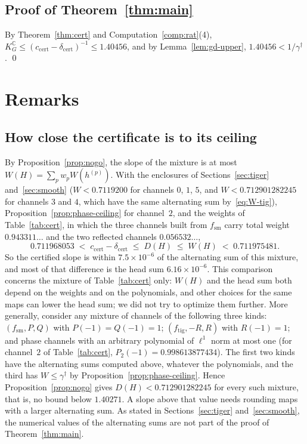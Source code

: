 \documentclass[11pt,reqno]{amsart}
\theoremstyle{definition}
\numberwithin{equation}{section}
\newcommand{\C}{\mathbb{C}}
\newcommand{\KGC}{K_G^{\C}}
\newcommand{\gd}{\gamma^\dagger}
\newcommand{\ftig}{f_{\mathrm{tig}}}
\newcommand{\fsm}{f_{\mathrm{sm}}}
\newcommand{\ccert}{c_{\mathrm{cert}}}
\newcommand{\dcert}{\delta_{\mathrm{cert}}}
\begin{document}
\subsection{Proof of Theorem~\ref{thm:main}}
By Theorem~\ref{thm:cert} and Computation~\ref{comp:rat}(4), $\KGC\le(\ccert-\dcert)^{-1}\le1.40456$, and by Lemma~\ref{lem:gd-upper}, $1.40456<1/\gd$. \qed

\section{Remarks}\label{sec:remarks}

\subsection{How close the certificate is to its ceiling}
By Proposition~\ref{prop:nogo}, the slope of the mixture is at most $W(H)=\sum_p w_p W(h^{(p)})$. With the enclosures of Sections~\ref{sec:tiger} and~\ref{sec:smooth} ($W<0.7119200$ for channels $0$, $1$, $5$, and $W<0.712901282245$ for channels $3$ and $4$, which have the same alternating sum by~\eqref{eq:W-tig}), Proposition~\ref{prop:phase-ceiling} for channel~$2$, and the weights of Table~\ref{tab:cert}, in which the three channels built from $\fsm$ carry total weight $0.943311\ldots$ and the two reflected channels $0.056532\ldots$,
\[
  0.711968053 \;<\; \ccert-\dcert \;\le\; D(H) \;\le\; W(H) \;<\; 0.711975481 .
\]
So the certified slope is within $7.5\times10^{-6}$ of the alternating sum of this mixture, and most of that difference is the head sum $6.16\times10^{-6}$. This comparison concerns the mixture of Table~\ref{tab:cert} only: $W(H)$ and the head sum both depend on the weights and on the polynomials, and other choices for the same maps can lower the head sum; we did not try to optimize them further. More generally, consider any mixture of channels of the following three kinds: $(\fsm,P,Q)$ with $P(-1)=Q(-1)=1$; $(\ftig,-R,R)$ with $R(-1)=1$; and phase channels with an arbitrary polynomial of $\ell^1$ norm at most one (for channel~$2$ of Table~\ref{tab:cert}, $P_2(-1)=0.998613877434$). The first two kinds have the alternating sums computed above, whatever the polynomials, and the third has $W\le\gd$ by Proposition~\ref{prop:phase-ceiling}. Hence Proposition~\ref{prop:nogo} gives $D(H)<0.712901282245$ for every such mixture, that is, no bound below $1.40271$. A slope above that value needs rounding maps with a larger alternating sum. As stated in Sections~\ref{sec:tiger} and~\ref{sec:smooth}, the numerical values of the alternating sums are not part of the proof of Theorem~\ref{thm:main}.
\end{document}
